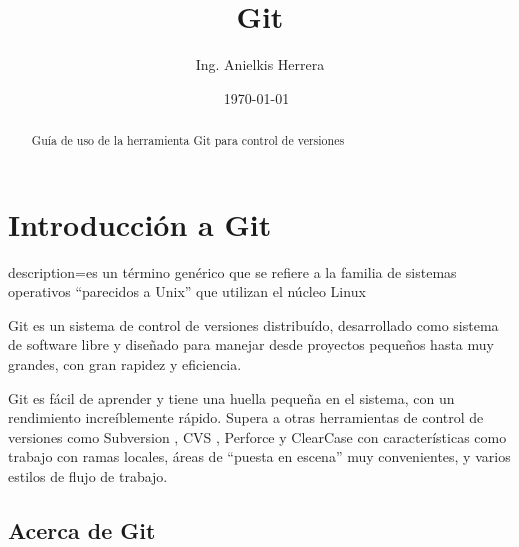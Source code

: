 \documentclass[12pt, spanish, oneside, onecolumn, a4paper]{article}
\begin{document}

\title{ Git }
\date{ \today\ }
\author{ Ing. Anielkis Herrera }

\maketitle

\begin{abstract}
Guía de uso de la herramienta Git para control de versiones
\end{abstract}

\newpage
{}


\chapter{Introducción a Git}
\label{chap:intro}




{
  description={es un término genérico que se refiere a la familia de sistemas operativos ``parecidos a Unix'' que utilizan el núcleo Linux}
}

Git es un sistema de control de versiones distribuído, desarrollado como sistema de software libre y diseñado para manejar desde proyectos pequeños hasta muy grandes, con gran rapidez y eficiencia.

Git es fácil de aprender y tiene una huella pequeña en el sistema, con un rendimiento increíblemente rápido. Supera a otras herramientas de control de versiones como Subversion , CVS , Perforce y ClearCase con características como trabajo con ramas locales, áreas de ``puesta en escena'' muy convenientes, y varios estilos de flujo de trabajo.


\section{Acerca de Git}
\label{sec:aboutgit}
\end{document}
